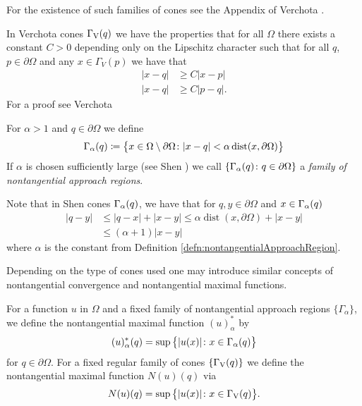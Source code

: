 For the existence of such families of cones see the Appendix of Verchota \cite{verchota}.

In Verchota cones $\Gamma_\mathrm{V}(q)$ we have the properties that for all $\Omega$ there exists a constant $C > 0$ depending only on the Lipschitz character such that for all $q$, $p \in \partial\Omega$ and any $x \in \Gamma_V(p)$ we have that
\begin{align}
  |x - q| &\geq C |x - p| \label{eq:verCone1}\\ 
  |x - q| &\geq C |p - q|.\label{eq:verCone2}
\end{align}
For a proof see Verchota \cite[p.\@~9f.]{verchota}

\begin{defn}
  \label{defn:nontangentialApproachRegion}
   For $\alpha > 1$ and $q \in \partial\Omega$ we define 
   \begin{align*}
     \Gamma_\alpha(q) \coloneqq \big\{ x \in \Omega \setminus \partial\Omega \colon |x - q| < \alpha \operatorname{dist}(x, \partial\Omega) \big\}
   \end{align*}
   If $\alpha$ is chosen sufficiently large (see Shen \cite{Shen2017}) we call $\{ \Gamma_\alpha(q) \colon q \in \partial\Omega\}$ a \emph{family of nontangential approach regions}.
\end{defn}

  Note that in Shen cones $\Gamma_\alpha(q)$, we have that for $q, y \in \partial\Omega$ and $x \in \Gamma_\alpha(q)$
\begin{align}
  \label{eq:shenConeEstimate}
  |q - y| 
  &\leq |q - x| + |x - y| 
  \leq \alpha \operatorname{dist}(x, \partial\Omega) + |x - y|  \nonumber\\
  &\leq (\alpha + 1) |x - y|
\end{align}
where $\alpha$ is the constant from Definition \ref{defn:nontangentialApproachRegion}. 

Depending on the type of cones used one may introduce similar concepts of nontangential convergence and nontangential maximal functions.

\begin{defn}
  For a function $u$ in $\Omega$ and a fixed family of nontangential approach regions $\{\Gamma_\alpha\}$, we define the nontangential maximal function $(u)_\alpha^*$ by
\begin{align}
  \label{eq:defnNontangMaxFunction}
  (u)_\alpha^*(q) = \sup\big\{ |u(x)| \colon x \in \Gamma_\alpha(q)\big\}
\end{align}
for $q \in \partial\Omega$.
  For a fixed regular family of cones $\{\Gamma_\mathrm{V}(q)\}$ we define the nontangential maximal function $N(u)(q)$ via
  \begin{align*}
    N(u)(q) = \sup\big\{ |u(x)| \colon x \in \Gamma_\mathrm{V}(q)\big\}.
  \end{align*}
\end{defn}

